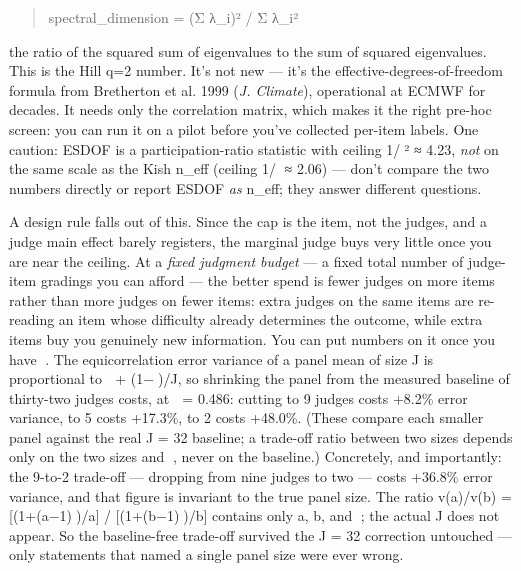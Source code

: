 \documentclass[11pt]{article}
\begin{document}
\begin{quote}\ttfamily
spectral\_dimension = (Σ λ\_i)² / Σ λ\_i²\\
\end{quote}

the ratio of the squared sum of eigenvalues to the sum of squared eigenvalues. This is the Hill q=2 number. It's not new — it's the effective-degrees-of-freedom formula from Bretherton et al. 1999 (\emph{J. Climate}), operational at ECMWF for decades. It needs only the correlation matrix, which makes it the right pre-hoc screen: you can run it on a pilot before you've collected per-item labels. One caution: ESDOF is a participation-ratio statistic with ceiling 1/² ≈ 4.23, \emph{not} on the same scale as the Kish n\_eff (ceiling 1/ ≈ 2.06) — don't compare the two numbers directly or report ESDOF \emph{as} n\_eff; they answer different questions.

A design rule falls out of this. Since the cap is the item, not the judges, and a judge main effect barely registers, the marginal judge buys very little once you are near the ceiling. At a \emph{fixed judgment budget} — a fixed total number of judge-item gradings you can afford — the better spend is fewer judges on more items rather than more judges on fewer items: extra judges on the same items are re-reading an item whose difficulty already determines the outcome, while extra items buy you genuinely new information. You can put numbers on it once you have . The equicorrelation error variance of a panel mean of size J is proportional to  + (1−)/J, so shrinking the panel from the measured baseline of thirty-two judges costs, at  = 0.486: cutting to 9 judges costs +8.2\% error variance, to 5 costs +17.3\%, to 2 costs +48.0\%. (These compare each smaller panel against the real J = 32 baseline; a trade-off ratio between two sizes depends only on the two sizes and , never on the baseline.) Concretely, and importantly: the 9-to-2 trade-off — dropping from nine judges to two — costs +36.8\% error variance, and that figure is invariant to the true panel size. The ratio v(a)/v(b) = [(1+(a−1))/a] / [(1+(b−1))/b] contains only a, b, and ; the actual J does not appear. So the baseline-free trade-off survived the J = 32 correction untouched — only statements that named a single panel size were ever wrong.
\end{document}
